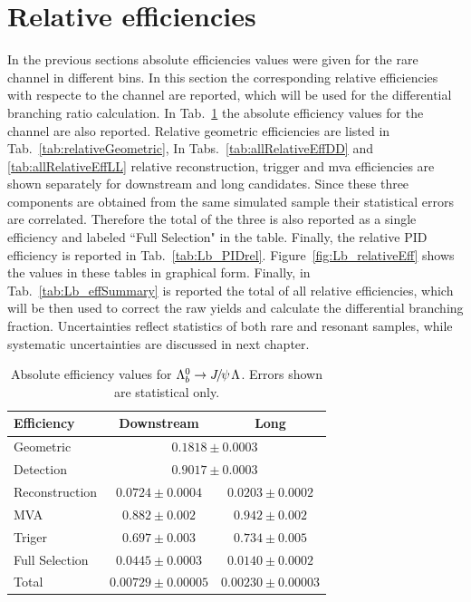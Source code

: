 \section{Relative efficiencies}

In the previous sections absolute efficiencies values were given for the rare channel in different \qsq bins.
In this section the corresponding relative efficiencies with respecte to the \Lb\to\jpsi\Lz channel are reported, which will be used for
the differential branching ratio calculation. In Tab.~\ref{tab:jpsiEff} the absolute efficiency values
for the \jpsi channel are also reported. Relative geometric efficiencies are listed in Tab.~\ref{tab:relativeGeometric},
In Tabs.~\ref{tab:allRelativeEffDD} and \ref{tab:allRelativeEffLL} relative reconstruction, trigger and mva efficiencies 
are shown separately for downstream and long candidates. Since these three components are obtained from the same simulated sample
their statistical errors are correlated. Therefore the total of the three is also reported as a single efficiency
and labeled ``Full Selection" in the table. Finally, the relative PID efficiency is reported in Tab.~\ref{tab:Lb_PIDrel}.
Figure~\ref{fig:Lb_relativeEff} shows the values in these tables in graphical form.
Finally, in Tab.~\ref{tab:Lb_effSummary} is reported the total of all relative efficiencies, which will be then used
to correct the raw yields and calculate the differential branching fraction.
Uncertainties reflect statistics of both rare and resonant samples, while systematic uncertainties are discussed in next chapter.

\begin{table}
\centering
\caption{Absolute efficiency values for $\Lb\to\jpsi\Lz$. Errors shown are statistical only.}
\begin{tabular}{lcc} \hline
Efficiency		& 	Downstream				& 	Long				\\  \hline		
Geometric 		&   	\multicolumn{2}{c}{	$0.1818 \pm 0.0003$ } 	\\	
Detection 		&   	\multicolumn{2}{c}{	$0.9017 \pm 0.0003$ } 	\\
Reconstruction 	& 	$0.0724 \pm 0.0004$   & $0.0203 \pm 0.0002$     \\
MVA 			&	$0.882 \pm 0.002$   & $0.942 \pm 0.002$     \\
Triger 			&	$0.697 \pm 0.003$   & $0.734 \pm 0.005$     \\ \hline
Full Selection	&	$0.0445 \pm 0.0003$   & $0.0140 \pm 0.0002$     \\ \hline
Total  			&	$0.00729 \pm 0.00005$   & $0.00230 \pm 0.00003$    	\\
\end{tabular}
\label{tab:jpsiEff}
\end{table}


